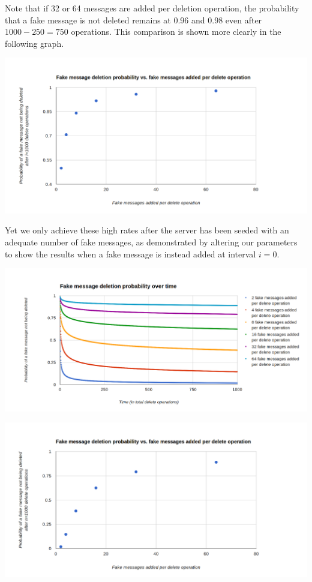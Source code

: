 \documentclass[pageno]{jpaper}
\begin{document}
Note that if 32 or 64 messages are added per deletion operation, the probability that a fake message is not deleted remains at 0.96 and 0.98 even after $1000-250=750$ operations. This comparison is shown more clearly in the following graph.

\includegraphics[width=\textwidth]{few-blue-dots-250}


Yet we only achieve these high rates after the server has been seeded with an adequate number of fake messages, as demonstrated by altering our parameters to show the results when a fake message is instead added at interval $i=0$.

\includegraphics[width=\textwidth]{fake-message-deletion-over-time}

\includegraphics[width=\textwidth]{fake-message-deletion-probability-vs-num-fake-messages-added}
\end{document}
